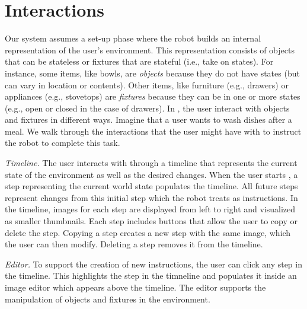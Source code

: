\section{\projname Interactions}
Our system assumes a set-up phase where the robot builds an internal representation of the user's environment. This representation consists of objects that can be stateless or fixtures that are stateful (i.e., take on states). For instance, some items, like bowls, are \textit{objects} because they do not have states (but can vary in location or contents). Other items, like furniture (e.g., drawers) or appliances (e.g., stovetops) are \textit{fixtures} because they can be in one or more states (e.g., open or closed in the case of drawers). In \projname, the user interact with objects and fixtures in different ways. Imagine that a user wants to wash dishes after a meal. We walk through the interactions that the user might have with \projname to instruct the robot to complete this task.



\emph{Timeline.} The user interacts with \projname through a timeline that represents the current state of the environment as well as the desired changes. When the user starts \projname, a step representing the current world state populates the timeline. All future steps represent changes from this initial step which the robot treats as instructions. In the timeline, images for each step are displayed from left to right and visualized as smaller thumbnails. Each step includes buttons that allow the user to copy or delete the step. Copying a step creates a new step with the same image, which the user can then modify. Deleting a step removes it from the timeline.

\emph{Editor.} To support the creation of new instructions, the user can click any step in the timeline. This highlights the step in the timneline and populates it inside an image editor which appears above the timeline. The editor supports the manipulation of objects and fixtures in the environment.

